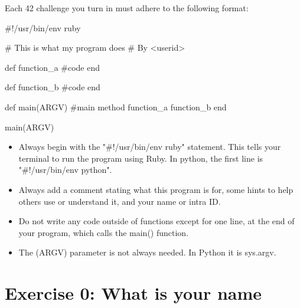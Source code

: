 \documentclass{42-en}
\begin{document}
Each 42 challenge you turn in must adhere to the following format:

\begin{42rbcode}
#!/usr/bin/env ruby

# This is what my program does
# By <userid>

def function_a
 #code
end

def function_b
 #code
end

def main(ARGV)
 #main method
 function_a
 function_b
end

main(ARGV)
\end{42rbcode}

\begin{itemize}
	\item Always begin with the "\#!/usr/bin/env ruby" statement. This tells your terminal to run the program using Ruby. In python, the first line is "\#!/usr/bin/env python".
	\item Always add a comment stating what this program is for, some hints to help others use or understand it, and your name or intra ID.
	\item Do not write any code outside of functions except for one line, at the end of your program, which calls the main() function.
	\item The (ARGV) parameter is not always needed. In Python it is sys.argv.
\end{itemize}


\startexercices



\chapter{Exercise 0: What is your name}

\makeheaderfiles
\end{document}
